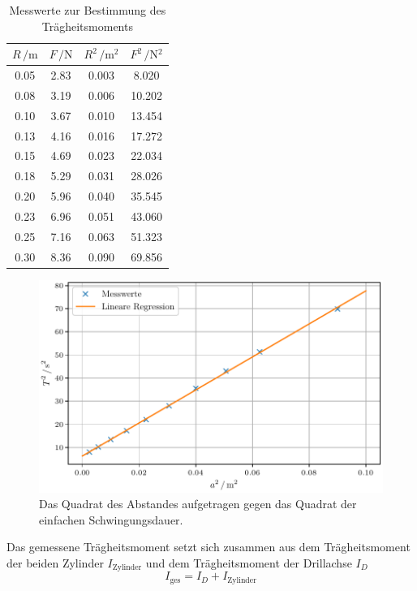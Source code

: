 \begin{table}[H]
  \centering
  \caption{Messwerte zur Bestimmung des Trägheitsmoments}
  \label{tab:Traegheitsmoment}
  \begin{tabular}{
  c c c c
  }
    \toprule
     $R \, / \unit{\meter}$ & $F\, / \unit{\newton}$
      & $R^2 \, / \unit{\meter^2}$ & $F^2\, / \unit{\newton^2}$\\
    \midrule
    0.05 & 2.83 & 0.003 & 8.020\\
    0.08 & 3.19 & 0.006 & 10.202\\
    0.10 & 3.67 & 0.010 & 13.454\\
    0.13 & 4.16 & 0.016 & 17.272\\
    0.15 & 4.69 & 0.023 & 22.034\\
    0.18 & 5.29 & 0.031 & 28.026\\
    0.20 & 5.96 & 0.040 & 35.545\\
    0.23 & 6.96 & 0.051 & 43.060\\
    0.25 & 7.16 & 0.063 & 51.323\\
    0.30 & 8.36 & 0.090 & 69.856\\
    \bottomrule
  \end{tabular}
\end{table}
\begin{figure}[H]
  \centering
  \includegraphics[scale=0.6]{plotI_D.pdf}
  \caption{Das Quadrat des Abstandes aufgetragen gegen das Quadrat der einfachen Schwingungsdauer.}
  \label{fig:Plot1}
\end{figure}
\noindent
Das gemessene Trägheitsmoment setzt sich zusammen aus dem Trägheitsmoment der beiden Zylinder $I_\text{Zylinder}$
  und dem Trägheitsmoment der Drillachse $I_D$
  \begin{equation}
    I_{\text{ges}} = I_D + I_{\text{Zylinder}}
   \end{equation}
